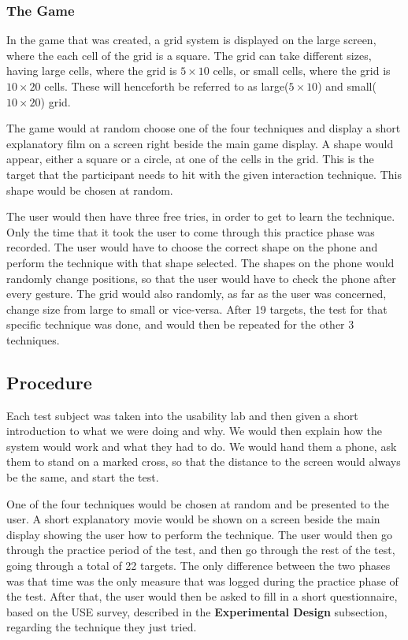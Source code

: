 \subsubsection{The Game}


In the game that was created, a grid system is displayed on the large screen, where the each cell of the grid is a square. The grid can take different sizes, having large cells, where the grid is $5 \times 10$ cells, or small cells, where the grid is $10 \times 20$ cells. These will henceforth be referred to as large($5 \times 10$) and small($10 \times 20$) grid.

The game would at random choose one of the four techniques and display a short explanatory film on a screen right beside the main game display. A shape would appear, either a square or a circle, at one of the cells in the grid. This is the target that the participant needs to hit with the given interaction technique. This shape would be chosen at random. 

The user would then have three free tries, in order to get to learn the technique. Only the time that it took the user to come through this practice phase was recorded. The user would have to choose the correct shape on the phone and perform the technique with that shape selected. The shapes on the phone would randomly change positions, so that the user would have to check the phone after every gesture. The grid would also randomly, as far as the user was concerned, change size from large to small or vice-versa. After 19 targets, the test for that specific technique was done, and would then be repeated for the other 3 techniques. 

\subsection{Procedure}

Each test subject was taken into the usability lab and then given a short introduction to what we were doing and why. We would then explain how the system would work and what they had to do. We would hand them a phone, ask them to stand on a marked cross, so that the distance to the screen would always be the same, and start the test.

One of the four techniques would be chosen at random and be presented to the user. A short explanatory movie would be shown on a screen beside the main display showing the user how to perform the technique. The user would then go through the practice period of the test, and then go through the rest of the test, going through a total of 22 targets. The only difference between the two phases was that time was the only measure that was logged during the practice phase of the test. After that, the user would then be asked to fill in a short questionnaire, based on the USE survey, described in the \textbf{Experimental Design} subsection, regarding the technique they just tried. 

